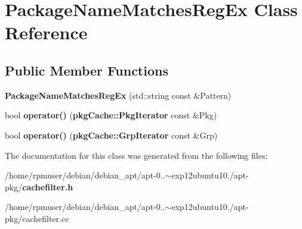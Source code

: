 \section{\-Package\-Name\-Matches\-Reg\-Ex \-Class \-Reference}
\label{classAPT_1_1CacheFilter_1_1PackageNameMatchesRegEx}
\subsection*{\-Public \-Member \-Functions}
\begin{DoxyCompactItemize}
\item 
{\bfseries \-Package\-Name\-Matches\-Reg\-Ex} (std\-::string const \&\-Pattern)\label{classAPT_1_1CacheFilter_1_1PackageNameMatchesRegEx_a198f8a63d3b97a8dadde337ab93c1195}

\item 
bool {\bfseries operator()} ({\bf pkg\-Cache\-::\-Pkg\-Iterator} const \&\-Pkg)\label{classAPT_1_1CacheFilter_1_1PackageNameMatchesRegEx_a8b4f56d3577102e20aadcff248a25885}

\item 
bool {\bfseries operator()} ({\bf pkg\-Cache\-::\-Grp\-Iterator} const \&\-Grp)\label{classAPT_1_1CacheFilter_1_1PackageNameMatchesRegEx_a01cbece7d55e59f38457ea4e77bc0d05}

\end{DoxyCompactItemize}


\-The documentation for this class was generated from the following files\-:\begin{DoxyCompactItemize}
\item 
/home/rpmuser/debian/debian\-\_\-apt/apt-\/0..$\sim$exp12ubuntu10./apt-\/pkg/{\bf cachefilter.\-h}\item 
/home/rpmuser/debian/debian\-\_\-apt/apt-\/0..$\sim$exp12ubuntu10./apt-\/pkg/cachefilter.\-cc\end{DoxyCompactItemize}
